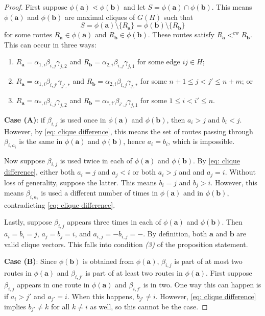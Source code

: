 \documentclass[12pt]{amsart}
\theoremstyle{definition}
\newcommand\ba{\mathbf{a}}
\newcommand\bb{\mathbf{b}}
\DeclareMathOperator{\cw}{cw}
\begin{document}
\begin{proof}
    First suppose $\phi(\ba) \lessdot \phi(\bb)$ and let $S = \phi(\ba) \cap \phi(\bb)$.
    This means $\phi(\ba)$ and $\phi(\bb)$ are maximal cliques of $G(H)$ such that
    \begin{equation}\label{eq: clique difference}
       S = \phi(\ba) \setminus \{R_\ba\} = \phi(\bb) \setminus \{R_\bb\}
    \end{equation}
    for some routes $R_\ba \in \phi(\ba)$ and $R_\bb \in \phi(\bb)$.
    These routes satisfy $R_\ba <^{\cw} R_\bb$.
    This can occur in three ways:
    \begin{enumerate}
        \item[(A)] $R_\ba = \alpha_{1,i}\beta_{i,j}\gamma_{j,2}$ and $R_\bb = \alpha_{2,i}\beta_{i,j}\gamma_{j,1}$ for some edge $ij \in H$;
        \item[(B)] $R_\ba = \alpha_{1,i}\beta_{i,j'}\gamma_{j',*}$ and $R_\bb = \alpha_{2,i}\beta_{i,j}\gamma_{j,*}$ for some $n+1 \leq j < j' \leq n+m$; or
        \item[(C)] $R_\ba = \alpha_{*,i}\beta_{i,j}\gamma_{j,2}$ and $R_\bb = \alpha_{*,i'}\beta_{i',j}\gamma_{j,1}$ for some $1 \leq i < i' \leq n$. 
    \end{enumerate}

    \textbf{Case (A)}: if $\beta_{i,j}$ is used once in $\phi(\ba)$ and $\phi(\bb)$, then $a_i > j$ and $b_i < j$.
    However, by \eqref{eq: clique difference}, this means the set of routes passing through $\beta_{i,a_i}$ is the same in $\phi(\ba)$ and $\phi(\bb)$, hence $a_i = b_i$, which is impossible. 
    
    Now suppose $\beta_{i,j}$ is used twice in each of $\phi(\ba)$ and $\phi(\bb)$.
    By \eqref{eq: clique difference}, either both $a_i = j$ and $a_j< i$ or both $a_i>j$ and and $a_j = i$. 
    Without loss of generality, suppose the latter. 
    This means $b_i = j$ and $b_j > i$.
    However, this means $\beta_{i,a_i}$ is used a different number of times in $\phi(\ba)$ and in $\phi(\bb)$, contradicting \eqref{eq: clique difference}.

    Lastly, suppose $\beta_{i,j}$ appears three times in each of $\phi(\ba)$ and $\phi(\bb)$.
    Then $a_i = b_i = j$, $a_j = b_j = i$, and $a_{i,j} = -b_{i,j} = -$.
    By definition, both $\ba$ and $\bb$ are valid clique vectors.
    This falls into condition \emph{(3)} of the proposition statement.

    \textbf{Case (B)}: Since $\phi(\bb)$ is obtained from $\phi(\ba)$, $\beta_{i,j}$ is part of at most two routes in $\phi(\ba)$ and $\beta_{i,j'}$ is part of at least two routes in $\phi(\ba)$.
    First suppose $\beta_{i,j}$ appears in one route in $\phi(\ba)$ and $\beta_{i,j'}$ is in two.
    One way this can happen is if $a_i > j'$ and $a_{j'} = i$.
    When this happens, $b_{j'} \neq i$.
    However, \eqref{eq: clique difference} implies $b_{j'} \neq k$ for all $k \neq i$ as well, so this cannot be the case.


\end{proof}
\end{document}
